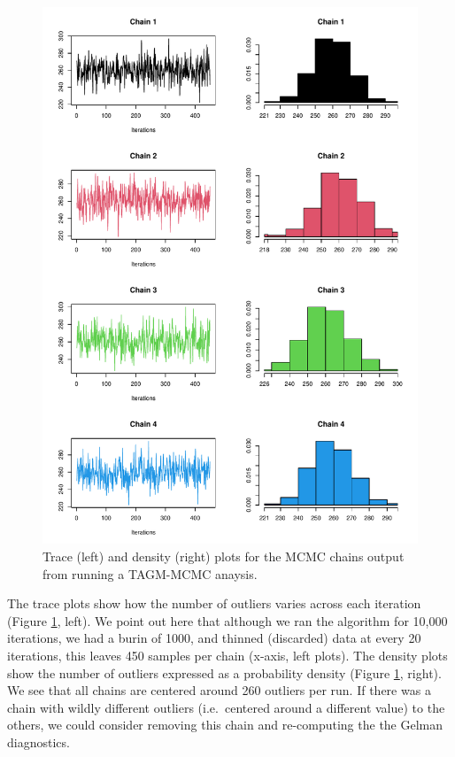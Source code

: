 \documentclass[9pt,a4paper,]{extarticle}
\begin{document}
\begin{figure}[H]

{\centering \includegraphics[width=0.8\linewidth,]{figs/tagm_mcmc_trace_dens} 

}

\caption{Trace (left) and density (right) plots for the MCMC chains output from running a TAGM-MCMC anaysis.}\label{fig:mcmc-figs}
\end{figure}

The trace plots show how the number of outliers varies across each iteration (Figure \ref{fig:mcmc-figs}, left).
We point out here that although we ran the algorithm for 10,000 iterations,
we had a burin of 1000, and thinned (discarded) data at every 20 iterations,
this leaves 450 samples per chain (x-axis, left plots). The density plots show
the number of outliers expressed as a probability density (Figure \ref{fig:mcmc-figs}, right).
We see that all chains are centered around 260 outliers per run. If there was a
chain with wildly different outliers (i.e.~centered around a different value) to
the others, we could consider removing this chain and re-computing the the Gelman
diagnostics.
\end{document}
